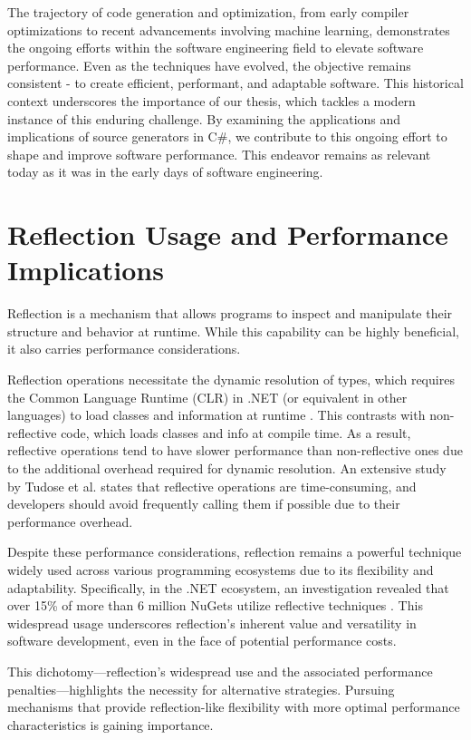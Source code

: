 The trajectory of code generation and optimization, from early compiler optimizations to recent advancements involving machine learning, demonstrates the ongoing efforts within the software engineering field to elevate software performance. Even as the techniques have evolved, the objective remains consistent - to create efficient, performant, and adaptable software. This historical context underscores the importance of our thesis, which tackles a modern instance of this enduring challenge. By examining the applications and implications of source generators in C\#, we contribute to this ongoing effort to shape and improve software performance. This endeavor remains as relevant today as it was in the early days of software engineering.

\section{Reflection Usage and Performance Implications}

Reflection is a mechanism that allows programs to inspect and manipulate their structure and behavior at runtime. While this capability can be highly beneficial, it also carries performance considerations.

Reflection operations necessitate the dynamic resolution of types, which requires the Common Language Runtime (CLR) in .NET (or equivalent in other languages) to load classes and information at runtime \cite{Tudose2013}. This contrasts with non-reflective code, which loads classes and info at compile time. As a result, reflective operations tend to have slower performance than non-reflective ones due to the additional overhead required for dynamic resolution. An extensive study by Tudose et al. \cite{Tudose2013} states that reflective operations are time-consuming, and developers should avoid frequently calling them if possible due to their performance overhead.

Despite these performance considerations, reflection remains a powerful technique widely used across various programming ecosystems due to its flexibility and adaptability. Specifically, in the .NET ecosystem, an investigation revealed that over 15\% of more than 6 million NuGets utilize reflective techniques \cite{Beaumont2022}. This widespread usage underscores reflection's inherent value and versatility in software development, even in the face of potential performance costs.

This dichotomy—reflection's widespread use and the associated performance penalties—highlights the necessity for alternative strategies. Pursuing mechanisms that provide reflection-like flexibility with more optimal performance characteristics is gaining importance.

